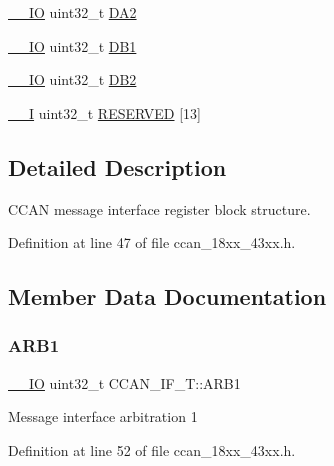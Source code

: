 \begin{DoxyCompactItemize}
\item 
\hyperlink{core__sc300_8h_aec43007d9998a0a0e01faede4133d6be}{\+\_\+\+\_\+\+IO} uint32\+\_\+t \hyperlink{struct_c_c_a_n___i_f___t_a1589de9f6b458f50ed2a1028d95e4ab5}{D\+A2}
\item 
\hyperlink{core__sc300_8h_aec43007d9998a0a0e01faede4133d6be}{\+\_\+\+\_\+\+IO} uint32\+\_\+t \hyperlink{struct_c_c_a_n___i_f___t_a8e2cf9817f0f41c49efddcb93cf99e05}{D\+B1}
\item 
\hyperlink{core__sc300_8h_aec43007d9998a0a0e01faede4133d6be}{\+\_\+\+\_\+\+IO} uint32\+\_\+t \hyperlink{struct_c_c_a_n___i_f___t_acda963ad737b4369a4de8e67ce9185e0}{D\+B2}
\item 
\hyperlink{core__sc300_8h_af63697ed9952cc71e1225efe205f6cd3}{\+\_\+\+\_\+I} uint32\+\_\+t \hyperlink{struct_c_c_a_n___i_f___t_a140e0a58a7e38275d2eb77f6a262708b}{R\+E\+S\+E\+R\+V\+ED} \mbox{[}13\mbox{]}
\end{DoxyCompactItemize}


\subsection{Detailed Description}
C\+C\+AN message interface register block structure. 

Definition at line 47 of file ccan\+\_\+18xx\+\_\+43xx.\+h.



\subsection{Member Data Documentation}
\mbox{\label{struct_c_c_a_n___i_f___t_a48de9f54549ad822cf2a764c0664628e}} 
\subsubsection{\texorpdfstring{A\+R\+B1}{ARB1}}
{\footnotesize\ttfamily \hyperlink{core__sc300_8h_aec43007d9998a0a0e01faede4133d6be}{\+\_\+\+\_\+\+IO} uint32\+\_\+t C\+C\+A\+N\+\_\+\+I\+F\+\_\+\+T\+::\+A\+R\+B1}

Message interface arbitration 1 

Definition at line 52 of file ccan\+\_\+18xx\+\_\+43xx.\+h.

\mbox{\label{struct_c_c_a_n___i_f___t_a09d45c8fb62c789ea01abf6925d2c10a}} 
